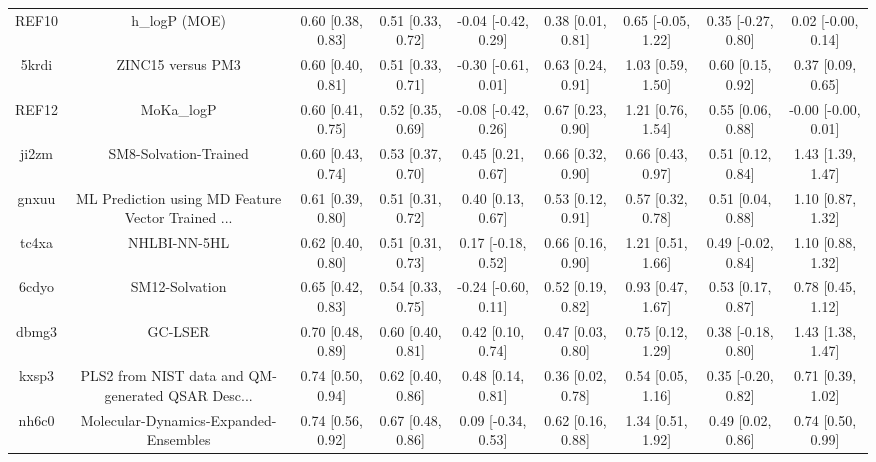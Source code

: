 \documentclass{article}
\begin{document}
\begin{center}
\begin{longtable}{|ccccccccc|}
 REF10 &                                      h\_logP (MOE) &  0.60 [0.38, 0.83] &  0.51 [0.33, 0.72] &   -0.04 [-0.42, 0.29] &  0.38 [0.01, 0.81] &   0.65 [-0.05, 1.22] &   0.35 [-0.27, 0.80] &    0.02 [-0.00, 0.14] \\
 5krdi &                                  ZINC15 versus PM3 &  0.60 [0.40, 0.81] &  0.51 [0.33, 0.71] &   -0.30 [-0.61, 0.01] &  0.63 [0.24, 0.91] &    1.03 [0.59, 1.50] &    0.60 [0.15, 0.92] &     0.37 [0.09, 0.65] \\
 REF12 &                                         MoKa\_logP &  0.60 [0.41, 0.75] &  0.52 [0.35, 0.69] &   -0.08 [-0.42, 0.26] &  0.67 [0.23, 0.90] &    1.21 [0.76, 1.54] &    0.55 [0.06, 0.88] &   -0.00 [-0.00, 0.01] \\
 ji2zm &                              SM8-Solvation-Trained &  0.60 [0.43, 0.74] &  0.53 [0.37, 0.70] &     0.45 [0.21, 0.67] &  0.66 [0.32, 0.90] &    0.66 [0.43, 0.97] &    0.51 [0.12, 0.84] &     1.43 [1.39, 1.47] \\
 gnxuu &  ML Prediction using MD Feature Vector Trained ... &  0.61 [0.39, 0.80] &  0.51 [0.31, 0.72] &     0.40 [0.13, 0.67] &  0.53 [0.12, 0.91] &    0.57 [0.32, 0.78] &    0.51 [0.04, 0.88] &     1.10 [0.87, 1.32] \\
 tc4xa &                                       NHLBI-NN-5HL &  0.62 [0.40, 0.80] &  0.51 [0.31, 0.73] &    0.17 [-0.18, 0.52] &  0.66 [0.16, 0.90] &    1.21 [0.51, 1.66] &   0.49 [-0.02, 0.84] &     1.10 [0.88, 1.32] \\
 6cdyo &                                     SM12-Solvation &  0.65 [0.42, 0.83] &  0.54 [0.33, 0.75] &   -0.24 [-0.60, 0.11] &  0.52 [0.19, 0.82] &    0.93 [0.47, 1.67] &    0.53 [0.17, 0.87] &     0.78 [0.45, 1.12] \\
 dbmg3 &                                            GC-LSER &  0.70 [0.48, 0.89] &  0.60 [0.40, 0.81] &     0.42 [0.10, 0.74] &  0.47 [0.03, 0.80] &    0.75 [0.12, 1.29] &   0.38 [-0.18, 0.80] &     1.43 [1.38, 1.47] \\
 kxsp3 &  PLS2 from NIST data and QM-generated QSAR Desc... &  0.74 [0.50, 0.94] &  0.62 [0.40, 0.86] &     0.48 [0.14, 0.81] &  0.36 [0.02, 0.78] &    0.54 [0.05, 1.16] &   0.35 [-0.20, 0.82] &     0.71 [0.39, 1.02] \\
 nh6c0 &              Molecular-Dynamics-Expanded-Ensembles &  0.74 [0.56, 0.92] &  0.67 [0.48, 0.86] &    0.09 [-0.34, 0.53] &  0.62 [0.16, 0.88] &    1.34 [0.51, 1.92] &    0.49 [0.02, 0.86] &     0.74 [0.50, 0.99] \\

\end{longtable}
\end{center}
\end{document}
